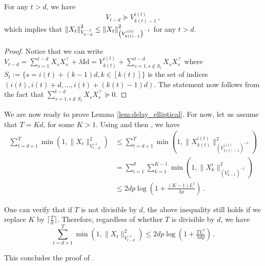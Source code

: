 \begin{lemma}
    For any $t>d$, we have 
    \[V_{t-d} 
\succcurlyeq V_{k(t)-1}^{i(t)}\,, \]
which implies that $ \left\|X_t\right\|_{V_{t-d}^{-1}}^2 \leq \left\|X_t\right\|_{\left(V_{k(t)-1}^{i(t)}\right)^{-1}}^2$ for any $t>d$.
\label{lem:loewner}
\end{lemma}
\begin{proof}
    Notice that we can write $V_{t-d} = \sum_{s=1}^{t-d}X_sX_s^{\top} + \lambda\mathrm{Id}=V_{k(t)}^{i(t)}+\sum_{s=1,s\notin S_t}^{t-d}X_sX_s^{\top}$ 
where $S_t := \{ s = i(t) + (k-1)d, k \in [k(t)] \}$ is the set of indices $(i(t), i(t)+d,\dots, i(t)+(k(t)-1)d)$. The statement now follows from the fact that $\sum_{s=1,s\notin S_t}^{t-d}X_sX_s^{\top} \succcurlyeq 0$. 
\end{proof}

We are now ready to prove Lemma \ref{lem:delay_elliptical}. For now, let us assume that $T = Kd$, for some $K > 1$. Using  and then , we have
\begin{align*}
\sum_{t=d+1}^{T}\min(1, \|X_t\|_{V_{t-d}^{-1}}^2) &\leq \sum_{t=d+1}^{T}\min(1, \|X_{k(t)}^{i(t)}\|_{(V_{k(t)-1}^{i(t)})^{-1}}^2)\\
&= \sum_{i=1}^{d}\sum_{k=1}^{K-1}\min(1, \|X_{k}^{i}\|_{(V_{k-1}^{i})^{-1}}^2)\\
&\leq 2dp\log(1 + \tfrac{(K-1)L^2}{\lambda p})\,.
\end{align*}

One can verify that if $T$ is not divisible by $d$, the above inequality still holds if we replace $K$ by $\lceil\frac{T}{d}\rceil$. Therefore, regardless of whether $T$ is divisible by $d$, we have
\begin{equation*}
\sum_{t=d+1}^{T}\min(1, \|X_t\|_{V_{t-d}^{-1}}^2) \leq 2dp\log(1 + \tfrac{TL^2}{\lambda dp})\,.
\end{equation*}

This concludes the proof of .

%
